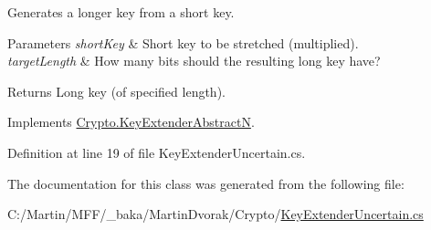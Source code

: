 Generates a longer key from a short key. 


\begin{DoxyParams}{Parameters}
{\em short\+Key} & Short key to be stretched (multiplied).\\
\hline
{\em target\+Length} & How many bits should the resulting long key have?\\
\hline
\end{DoxyParams}
\begin{DoxyReturn}{Returns}
Long key (of specified length).
\end{DoxyReturn}


Implements \hyperlink{class_crypto_1_1_key_extender_abstract_n_a9df4156ad0a84730f87119e5a25cf1ef}{Crypto.\+Key\+Extender\+Abstract\+N}.



Definition at line 19 of file Key\+Extender\+Uncertain.\+cs.



The documentation for this class was generated from the following file\+:\begin{DoxyCompactItemize}
\item 
C\+:/\+Martin/\+M\+F\+F/\+\_\+baka/\+Martin\+Dvorak/\+Crypto/\hyperlink{_key_extender_uncertain_8cs}{Key\+Extender\+Uncertain.\+cs}\end{DoxyCompactItemize}
